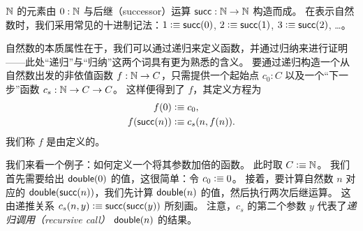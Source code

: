$\mathbb{N}$ 的元素由 $0 : \mathbb{N}$ 与后继（successor）运算 $\mathsf{succ} : \mathbb{N} \to \mathbb{N}$ 构造而成。
在表示自然数时，我们采用常见的十进制记法：$1 \vcentcolon\equiv \mathsf{succ}(0)$, $2 \vcentcolon\equiv \mathsf{succ}(1)$, $3 \vcentcolon\equiv \mathsf{succ}(2)$, \dots。

自然数的本质属性在于，我们可以通过递归来定义函数，并通过归纳来进行证明——此处``递归''与``归纳''这两个词具有更为熟悉的含义。
%
要通过递归构造一个从自然数出发的非依值函数 $f : \mathbb{N} \to C$，只需提供一个起始点 $c_0 : C$ 以及一个``下一步''函数 $c_s : \mathbb{N} \to C \to C$。
这样便得到了 $f$，其定义方程为
\begin{align*}
  f(0) &\vcentcolon\equiv c_0, \\
  f(\mathsf{succ}(n)) &\vcentcolon\equiv c_s(n,f(n)).
\end{align*}
我们称 $f$ 是由定义的。
%
%

我们来看一个例子：如何定义一个将其参数加倍的函数。
此时取 $C\vcentcolon\equiv \mathbb{N}$。
我们首先需要给出 $\mathsf{double}(0)$ 的值，这很简单：令 $c_0 \vcentcolon\equiv 0$。
接着，要计算自然数 $n$ 对应的 $\mathsf{double}(\mathsf{succ}(n))$，我们先计算 $\mathsf{double}(n)$ 的值，然后执行两次后继运算。
这由递推关系 $c_s(n,y) \vcentcolon\equiv \mathsf{succ}(\mathsf{succ}(y))$ 所刻画。
注意，$c_s$ 的第二个参数 $y$ 代表了\emph{递归调用（recursive call）} $\mathsf{double}(n)$ 的结果。

